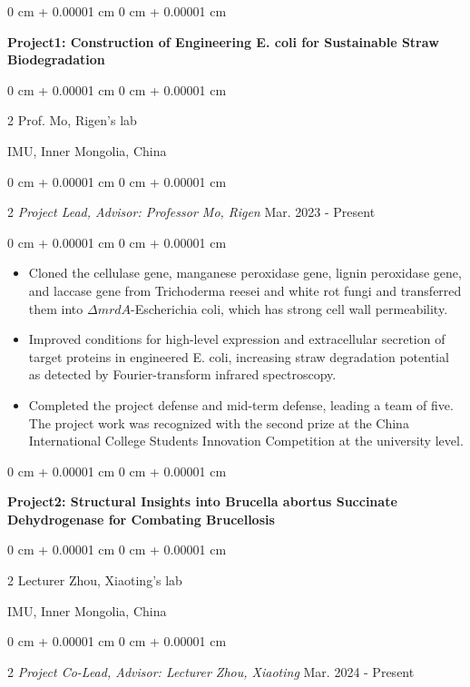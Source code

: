 \documentclass[10pt, letterpaper]{article}
\newenvironment{highlights}{
    \begin{itemize}[
        topsep=0.10 cm,
        parsep=0.10 cm,
        partopsep=0pt,
        itemsep=0pt,
        leftmargin=0 cm + 10pt
    ]
}{
    \end{itemize}
} %
\newenvironment{onecolentry}{
    \begin{adjustwidth}{
        0 cm + 0.00001 cm
    }{
        0 cm + 0.00001 cm
    }
}{
    \end{adjustwidth}
} %
\newenvironment{twocolentry}[2][]{
    \onecolentry
    \def\secondColumn{#2}
    \setcolumnwidth{\fill, 4.5 cm}
    \begin{paracol}{2}
}{
    \switchcolumn \raggedleft \secondColumn
    \end{paracol}
    \endonecolentry
} %
\begin{document}
        \begin{onecolentry}
        \setlength{\fontsize}{10.5pt}{14pt}\selectfont \textbf{Project1: Construction of Engineering E. coli for Sustainable Straw Biodegradation}\end{onecolentry}   
\vspace{0.1 cm}    
        \begin{twocolentry}{
            \normalsize IMU, Inner Mongolia, China
        }{Prof. Mo, Rigen's lab
            }
            \end{twocolentry}
\vspace{0.1 cm}
        \begin{twocolentry}{
            \normalsize Mar. 2023 - Present
        }{
            {\emph{Project Lead, Advisor: Professor Mo, Rigen}}} \end{twocolentry}
   
        \vspace{0.10 cm}
        \begin{onecolentry}
            \begin{highlights}
                \item Cloned the cellulase gene, manganese peroxidase gene, lignin peroxidase gene, and laccase gene from Trichoderma reesei and white rot fungi and transferred them into $\Delta mrdA$-Escherichia coli, which has strong cell wall permeability. 
                \item Improved conditions for high-level expression and extracellular secretion of target proteins in engineered E. coli, increasing straw degradation potential as detected by Fourier-transform infrared spectroscopy.
                \item Completed the project defense and mid-term defense, leading a team of five. The project work was recognized with the second prize at the China International College Students Innovation Competition at the university level.
            \end{highlights}
        \end{onecolentry}


        \vspace{0.2 cm}

       \begin{onecolentry}
       \setlength{\fontsize}{10.5pt}{14pt}\selectfont \textbf{Project2: Structural Insights into Brucella abortus Succinate Dehydrogenase for Combating Brucellosis}\end{onecolentry}
\vspace{0.1 cm}
            \begin{twocolentry}{
            \normalsize IMU, Inner Mongolia, China
        }{Lecturer Zhou, Xiaoting's lab
            }
           \end{twocolentry}
\vspace{0.1 cm}
        \begin{twocolentry}{
            \normalsize Mar. 2024 - Present
        }{
            {\emph{Project Co-Lead, Advisor: Lecturer Zhou, Xiaoting}}} \end{twocolentry}
\end{document}
